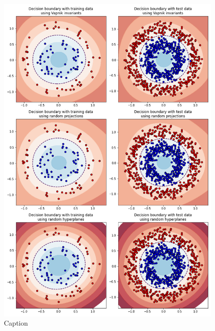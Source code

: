 \begin{figure}
    \centering
    \includegraphics[width=\textwidth]{thesis/Figures/circles_decision_boundaries.png}
    \caption{Caption}
    \label{fig:circles_decision_boundary}
\end{figure}

